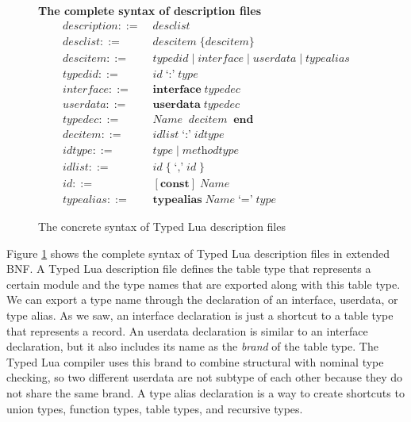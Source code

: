 \begin{figure}[!ht]
\textbf{The complete syntax of description files}\\
\dstart
\begin{align*}
\textit{description} ::= & \; \textit{desclist}\\
\textit{desclist} ::= & \; \textit{descitem} \; \{ \textit{descitem} \}\\
\textit{descitem} ::= & \; \textit{typedid} \; | \;
  \textit{interface} \; | \;
  \textit{userdata} \; | \;
  \textit{typealias}\\
\textit{typedid} ::= & \; \textit{id} \; \texttt{`:'} \; \textit{type}\\ 
\textit{interface} ::= & \; \textbf{interface} \; \textit{typedec}\\
\textit{userdata} ::= & \; \textbf{userdata} \; \textit{typedec}\\
\textit{typedec} ::= & \; \textit{Name} \; { \; \textit{decitem} \; } \; \textbf{end}\\
\textit{decitem} ::= & \; \textit{idlist} \; \texttt{`:'} \; \textit{idtype}\\
\textit{idtype} ::= & \; \textit{type} \; | \; \textit{methodtype}\\
\textit{idlist} ::= & \; \textit{id} \; \{ \; \texttt{`,'} \; \textit{id} \; \}\\
\textit{id} ::= & \; [\textbf{const}] \; \textit{Name}\\
\textit{typealias} ::= & \; \textbf{typealias} \; \textit{Name} \; \texttt{`='} \; \textit{type}
\end{align*}
\dend
\caption{The concrete syntax of Typed Lua description files}
\label{fig:tldsyntax}
\end{figure}

Figure \ref{fig:tldsyntax} shows the complete syntax of Typed Lua
description files in extended BNF.
A Typed Lua description file defines the table type that represents
a certain module and the type names that are exported
along with this table type.
We can export a type name through the declaration of an interface,
userdata, or type alias.
As we saw, an interface declaration is just a shortcut to a table type
that represents a record.
An userdata declaration is similar to an interface declaration,
but it also includes its name as the \emph{brand} of the table type.
The Typed Lua compiler uses this brand to combine structural with
nominal type checking, so two different userdata are not subtype
of each other because they do not share the same brand.
A type alias declaration is a way to create shortcuts to union types,
function types, table types, and recursive types.

